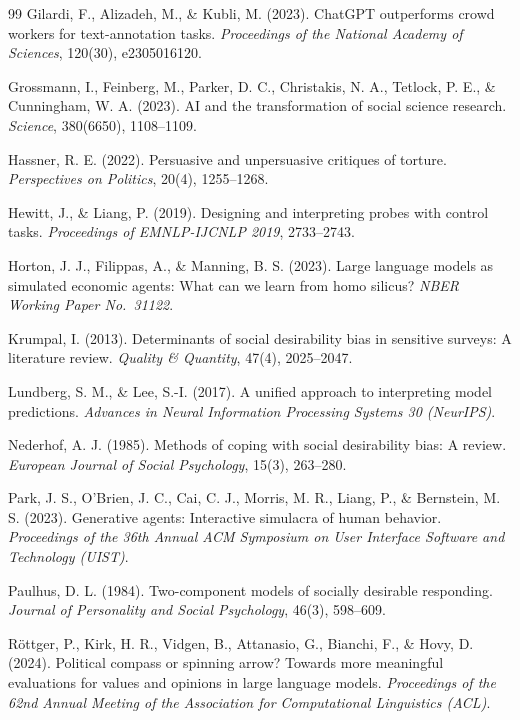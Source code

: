 \documentclass[14pt,a4paper]{extarticle}
\begin{document}
\begin{thebibliography}{99}
Gilardi, F., Alizadeh, M., \& Kubli, M. (2023). ChatGPT outperforms crowd workers for text-annotation tasks. \textit{Proceedings of the National Academy of Sciences}, 120(30), e2305016120.

Grossmann, I., Feinberg, M., Parker, D. C., Christakis, N. A., Tetlock, P. E., \& Cunningham, W. A. (2023). AI and the transformation of social science research. \textit{Science}, 380(6650), 1108--1109.

Hassner, R. E. (2022). Persuasive and unpersuasive critiques of torture. \textit{Perspectives on Politics}, 20(4), 1255--1268.

Hewitt, J., \& Liang, P. (2019). Designing and interpreting probes with control tasks. \textit{Proceedings of EMNLP-IJCNLP 2019}, 2733--2743.

Horton, J. J., Filippas, A., \& Manning, B. S. (2023). Large language models as simulated economic agents: What can we learn from homo silicus? \textit{NBER Working Paper No.\ 31122}.

Krumpal, I. (2013). Determinants of social desirability bias in sensitive surveys: A literature review. \textit{Quality \& Quantity}, 47(4), 2025--2047.

Lundberg, S. M., \& Lee, S.-I. (2017). A unified approach to interpreting model predictions. \textit{Advances in Neural Information Processing Systems 30 (NeurIPS)}.

Nederhof, A. J. (1985). Methods of coping with social desirability bias: A review. \textit{European Journal of Social Psychology}, 15(3), 263--280.

Park, J. S., O'Brien, J. C., Cai, C. J., Morris, M. R., Liang, P., \& Bernstein, M. S. (2023). Generative agents: Interactive simulacra of human behavior. \textit{Proceedings of the 36th Annual ACM Symposium on User Interface Software and Technology (UIST)}.

Paulhus, D. L. (1984). Two-component models of socially desirable responding. \textit{Journal of Personality and Social Psychology}, 46(3), 598--609.

R\"ottger, P., Kirk, H. R., Vidgen, B., Attanasio, G., Bianchi, F., \& Hovy, D. (2024). Political compass or spinning arrow? Towards more meaningful evaluations for values and opinions in large language models. \textit{Proceedings of the 62nd Annual Meeting of the Association for Computational Linguistics (ACL)}.


\end{thebibliography}
\end{document}
